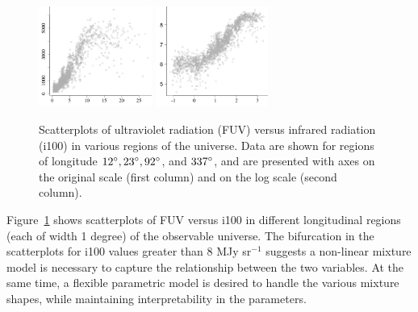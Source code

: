 \begin{figure}
   \includegraphics[width=0.33\textwidth]{figures/astro_data/4}
   \includegraphics[width=0.33\textwidth]{figures/astro_data/4_log}
\caption{Scatterplots of ultraviolet radiation (FUV) versus infrared radiation (i100) in various regions of the universe. Data are shown for regions of longitude $12\degree, 23\degree, 92\degree$, and $337\degree$, and are presented with axes on the original scale (first column) and on the log scale (second column).}\label{fig:astro_data}
\end{figure}

Figure~\ref{fig:astro_data} shows scatterplots of FUV versus i100 in different longitudinal regions (each of width 1 degree) of the observable universe. The bifurcation in the scatterplots for i100 values greater than 8 MJy sr$^{-1}$ suggests a non-linear mixture model is necessary to capture the relationship between the two variables. At the same time, a flexible parametric model is desired to handle the various mixture shapes, while maintaining interpretability in the parameters.

